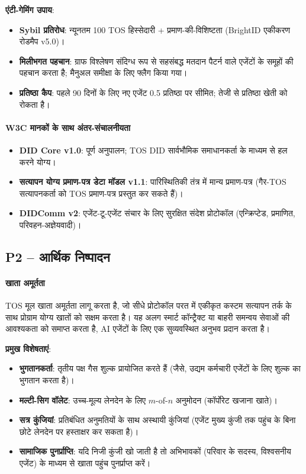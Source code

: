 \documentclass[11pt]{article}
\begin{document}
\begin{itemize}[noitemsep]
\begin{itemize}[noitemsep]
\textbf{एंटी-गेमिंग उपाय}:
\begin{itemize}[noitemsep]
  \item \textbf{Sybil प्रतिरोध}: न्यूनतम 100 TOS हिस्सेदारी + प्रमाण-की-विशिष्टता (BrightID एकीकरण रोडमैप v5.0)।
  \item \textbf{मिलीभगत पहचान}: ग्राफ विश्लेषण संदिग्ध रूप से सहसंबद्ध मतदान पैटर्न वाले एजेंटों के समूहों की पहचान करता है; मैनुअल समीक्षा के लिए फ्लैग किया गया।
  \item \textbf{प्रतिष्ठा कैप}: पहले 90 दिनों के लिए नए एजेंट 0.5 प्रतिष्ठा पर सीमित; तेजी से प्रतिष्ठा खेती को रोकता है।
\end{itemize}

\paragraph{W3C मानकों के साथ अंतर-संचालनीयता}
\begin{itemize}[noitemsep]
  \item \textbf{DID Core v1.0}: पूर्ण अनुपालन; TOS DID सार्वभौमिक समाधानकर्ता के माध्यम से हल करने योग्य।
  \item \textbf{सत्यापन योग्य प्रमाण-पत्र डेटा मॉडल v1.1}: पारिस्थितिकी तंत्र में मान्य प्रमाण-पत्र (गैर-TOS सत्यापनकर्ता को TOS प्रमाण-पत्र प्रस्तुत कर सकते हैं)।
  \item \textbf{DIDComm v2}: एजेंट-टू-एजेंट संचार के लिए सुरक्षित संदेश प्रोटोकॉल (एन्क्रिप्टेड, प्रमाणित, परिवहन-अज्ञेयवादी)।
\end{itemize}

\subsection{P2 -- आर्थिक निष्पादन}
\label{sec:pillar-economic}

\paragraph{खाता अमूर्तता}
TOS मूल खाता अमूर्तता लागू करता है, जो सीधे प्रोटोकॉल परत में एकीकृत कस्टम सत्यापन तर्क के साथ प्रोग्राम योग्य खातों को सक्षम करता है। यह अलग स्मार्ट कॉन्ट्रैक्ट या बाहरी समन्वय सेवाओं की आवश्यकता को समाप्त करता है, AI एजेंटों के लिए एक सुव्यवस्थित अनुभव प्रदान करता है।

\textbf{प्रमुख विशेषताएं}:
\begin{itemize}[noitemsep]
  \item \textbf{भुगतानकर्ता}: तृतीय पक्ष गैस शुल्क प्रायोजित करते हैं (जैसे, उद्यम कर्मचारी एजेंटों के लिए शुल्क का भुगतान करता है)।
  \item \textbf{मल्टी-सिग वॉलेट}: उच्च-मूल्य लेनदेन के लिए $m$-of-$n$ अनुमोदन (कॉर्पोरेट खजाना खाते)।
  \item \textbf{सत्र कुंजियां}: प्रतिबंधित अनुमतियों के साथ अस्थायी कुंजियां (एजेंट मुख्य कुंजी तक पहुंच के बिना छोटे लेनदेन पर हस्ताक्षर कर सकता है)।
  \item \textbf{सामाजिक पुनर्प्राप्ति}: यदि निजी कुंजी खो जाती है तो अभिभावकों (परिवार के सदस्य, विश्वसनीय एजेंट) के माध्यम से खाता पहुंच पुनर्प्राप्त करें।
\end{itemize}


\end{itemize}
\end{itemize}
\end{document}
